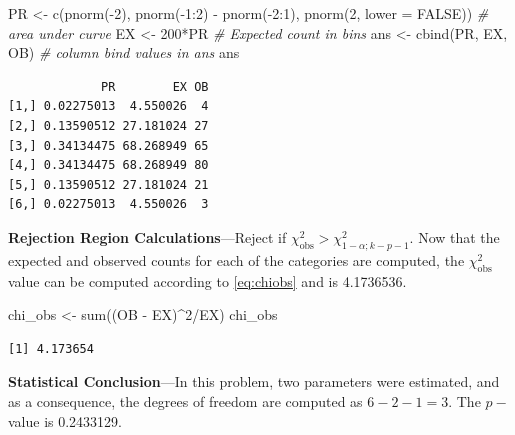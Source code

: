 \documentclass[
]{article}
\newenvironment{Shaded}{\begin{snugshade}}{\end{snugshade}}
\newcommand{\AttributeTok}[1]{\textcolor[rgb]{0.77,0.63,0.00}{#1}}
\newcommand{\CommentTok}[1]{\textcolor[rgb]{0.56,0.35,0.01}{\textit{#1}}}
\newcommand{\ConstantTok}[1]{\textcolor[rgb]{0.00,0.00,0.00}{#1}}
\newcommand{\DecValTok}[1]{\textcolor[rgb]{0.00,0.00,0.81}{#1}}
\newcommand{\FunctionTok}[1]{\textcolor[rgb]{0.00,0.00,0.00}{#1}}
\newcommand{\NormalTok}[1]{#1}
\newcommand{\OtherTok}[1]{\textcolor[rgb]{0.56,0.35,0.01}{#1}}
\newcommand{\SpecialCharTok}[1]{\textcolor[rgb]{0.00,0.00,0.00}{#1}}
\begin{document}
\begin{Shaded}
\begin{Highlighting}[]
\NormalTok{PR }\OtherTok{\textless{}{-}} \FunctionTok{c}\NormalTok{(}\FunctionTok{pnorm}\NormalTok{(}\SpecialCharTok{{-}}\DecValTok{2}\NormalTok{), }\FunctionTok{pnorm}\NormalTok{(}\SpecialCharTok{{-}}\DecValTok{1}\SpecialCharTok{:}\DecValTok{2}\NormalTok{) }\SpecialCharTok{{-}} \FunctionTok{pnorm}\NormalTok{(}\SpecialCharTok{{-}}\DecValTok{2}\SpecialCharTok{:}\DecValTok{1}\NormalTok{), }
        \FunctionTok{pnorm}\NormalTok{(}\DecValTok{2}\NormalTok{, }\AttributeTok{lower =} \ConstantTok{FALSE}\NormalTok{))  }\CommentTok{\# area under curve}
\NormalTok{EX }\OtherTok{\textless{}{-}} \DecValTok{200}\SpecialCharTok{*}\NormalTok{PR                      }\CommentTok{\# Expected count in bins}
\NormalTok{ans }\OtherTok{\textless{}{-}} \FunctionTok{cbind}\NormalTok{(PR, EX, OB)          }\CommentTok{\# column bind values in ans}
\NormalTok{ans}
\end{Highlighting}
\end{Shaded}

\begin{verbatim}
             PR        EX OB
[1,] 0.02275013  4.550026  4
[2,] 0.13590512 27.181024 27
[3,] 0.34134475 68.268949 65
[4,] 0.34134475 68.268949 80
[5,] 0.13590512 27.181024 21
[6,] 0.02275013  4.550026  3
\end{verbatim}

\textbf{Rejection Region Calculations}---Reject if \(\chi^2_{\text{obs}}>\chi^2_{1-\alpha;k-p-1}\). Now that the expected and observed counts for each of the categories are computed, the \(\chi_{\text{obs}}^2\) value can be computed according to \eqref{eq:chiobs} and is 4.1736536.

\begin{Shaded}
\begin{Highlighting}[]
\NormalTok{chi\_obs }\OtherTok{\textless{}{-}} \FunctionTok{sum}\NormalTok{((OB }\SpecialCharTok{{-}}\NormalTok{ EX)}\SpecialCharTok{\^{}}\DecValTok{2}\SpecialCharTok{/}\NormalTok{EX)}
\NormalTok{chi\_obs}
\end{Highlighting}
\end{Shaded}

\begin{verbatim}
[1] 4.173654
\end{verbatim}

\textbf{Statistical Conclusion}---In this problem, two parameters were estimated, and as a consequence, the degrees of freedom are computed as \(6-2-1=3\). The \(p-\)value is 0.2433129.
\end{document}
